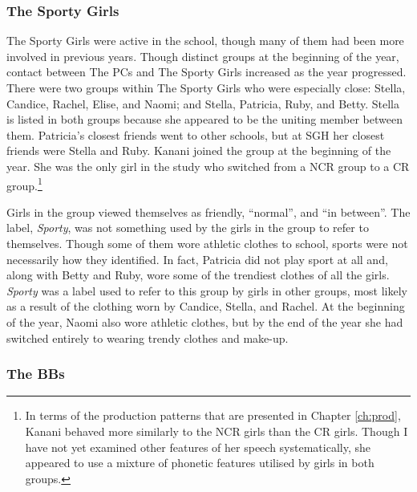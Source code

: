 \subsubsection{The Sporty Girls}
The Sporty Girls were active in the school, though many of them had been more involved in previous years. Though distinct groups at the beginning of the year, contact between The PCs and The Sporty Girls increased as the year progressed. There were two groups within The Sporty Girls who were especially close: Stella, Candice, Rachel, Elise, and Naomi; and Stella, Patricia, Ruby, and Betty. Stella is listed in both groups because she appeared to be the uniting member between them. Patricia's closest friends went to other schools, but at SGH her closest friends were Stella and Ruby. Kanani joined the group at the beginning of the year. She was the only girl in the study who switched from a NCR group to a CR group.\footnote{In terms of the production patterns that are presented in Chapter \ref{ch:prod}, Kanani behaved more similarly to the NCR girls than the CR girls. Though I have not yet examined other features of her speech systematically, she appeared to use a mixture of phonetic features utilised by girls in both groups.}

Girls in the group viewed themselves as friendly, ``normal'', and ``in between''. The label, \textsl{Sporty}, was not something used by the girls in the group to refer to themselves. Though some of them wore athletic clothes to school, sports were not necessarily how they identified. In fact, Patricia did not play sport at all and, along with Betty and Ruby, wore some of the trendiest clothes of all the girls. \textit{Sporty} was a label used to refer to this group by girls in other groups, most likely as a result of the clothing worn by Candice, Stella, and Rachel. At the beginning of the year, Naomi also wore athletic clothes, but by the end of the year she had switched entirely to wearing trendy clothes and make-up.


\subsubsection{The BBs}
\label{ex:pamodette}

